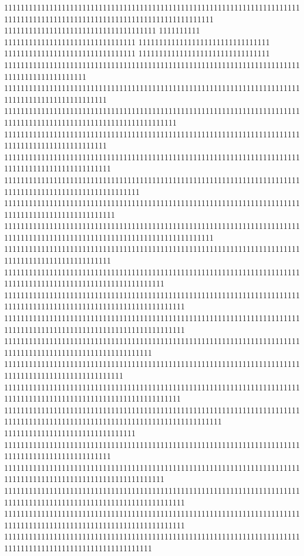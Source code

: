 111111111111111111111111111111111111111111111111111111111111111111111111111111111111111111111111111111111111111111111111111
1111111111111111111111111111111111111
1111111111
11111111111111111111111111111111
11111111111111111111111111111111
11111111111111111111111111111111
11111111111111111111111111111111
11111111111111111111111111111111111111111111111111111111111111111111111111111111111111111111
1111111111111111111111111111111111111111111111111111111111111111111111111111111111111111111111111
111111111111111111111111111111111111111111111111111111111111111111111111111111111111111111111111111111111111111111
1111111111111111111111111111111111111111111111111111111111111111111111111111111111111111111111111
11111111111111111111111111111111111111111111111111111111111111111111111111111111111111111111111111
111111111111111111111111111111111111111111111111111111111111111111111111111111111111111111111111111111111
111111111111111111111111111111111111111111111111111111111111111111111111111111111111111111111111111
111111111111111111111111111111111111111111111111111111111111111111111111111111111111111111111111111111111111111111111111111
11111111111111111111111111111111111111111111111111111111111111111111111111111111111111111111111111
111111111111111111111111111111111111111111111111111111111111111111111111111111111111111111111111111111111111111
11111111111111111111111111111111111111111111111111111111111111111111111111111111111111111111111111111111111111111111
11111111111111111111111111111111111111111111111111111111111111111111111111111111111111111111111111111111111111111111
111111111111111111111111111111111111111111111111111111111111111111111111111111111111111111111111111111111111
11111111111111111111111111111111111111111111111111111111111111111111111111111111111111111111111111111
1111111111111111111111111111111111111111111111111111111111111111111111111111111111111111111111111111111111111111111
11111111111111111111111111111111111111111111111111111111111111111111111111111111111111111111111111111111111111111111111111111
11111111111111111111111111111111
11111111111111111111111111111111111111111111111111111111111111111111111111111111111111111111111111
111111111111111111111111111111111111111111111111111111111111111111111111111111111111111111111111111111111111111
11111111111111111111111111111111111111111111111111111111111111111111111111111111111111111111111111111111111111111111
11111111111111111111111111111111111111111111111111111111111111111111111111111111111111111111111111111111111111111111
111111111111111111111111111111111111111111111111111111111111111111111111111111111111111111111111111111111111
